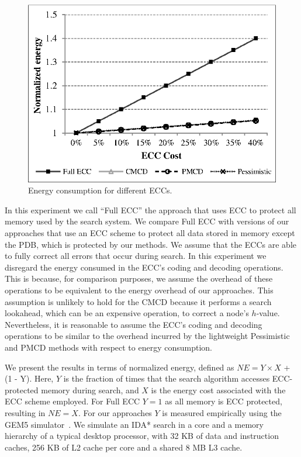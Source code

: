 \documentclass[letterpaper]{article}
\begin{document}
\begin{figure}
\centering
\includegraphics[scale=.9]{figures/ecc_chart.eps}
\caption{Energy consumption for different ECCs.}
\label{fig:ecc}
\end{figure}

In this experiment we call ``Full ECC'' the approach that uses ECC to protect all memory used by the search system. We compare Full ECC with versions of our approaches that use an ECC scheme to protect all data stored in memory except the PDB, which is protected by our methods. We assume that the ECCs are able to fully correct all errors that occur during search. In this experiment we disregard the energy consumed in the ECC's coding and decoding operations. This is because, for comparison purposes, we assume the overhead of these operations to be equivalent to the energy
overhead of our approaches. This assumption is unlikely to hold for the CMCD because it performs a search lookahead, which can be an expensive operation, to correct a node's $h$-value. Nevertheless, it is reasonable to assume the ECC's coding and decoding operations to be similar to the overhead incurred by the lightweight Pessimistic and PMCD methods with respect to energy consumption.


We present the results in terms of normalized energy, defined as $NE = Y \times X$ + (1 - Y). Here, $Y$ is the fraction of times that the search algorithm accesses ECC-protected memory during search, and $X$ is the energy cost associated with the ECC scheme employed. For Full ECC $Y = 1$ as all memory is ECC protected, resulting in $NE = X$. For our approaches $Y$ is measured empirically using the GEM5 simulator~\cite{Binkert2011}. We simulate an IDA* search in a core and a memory hierarchy of a typical desktop processor, with 32 KB of data and instruction caches, 256 KB of L2 cache per core and a shared 8 MB L3 cache.
\end{document}
